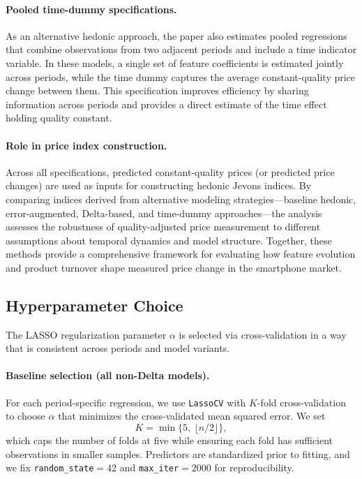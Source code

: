 \documentclass[12pt]{article}
\begin{document}
\paragraph{Pooled time-dummy specifications.}
As an alternative hedonic approach, the paper also estimates pooled regressions that combine observations from two adjacent periods and include a time indicator variable. In these models, a single set of feature coefficients is estimated jointly across periods, while the time dummy captures the average constant-quality price change between them. This specification improves efficiency by sharing information across periods and provides a direct estimate of the time effect holding quality constant.

\paragraph{Role in price index construction.}
Across all specifications, predicted constant-quality prices (or predicted price changes) are used as inputs for constructing hedonic Jevons indices. By comparing indices derived from alternative modeling strategies—baseline hedonic, error-augmented, Delta-based, and time-dummy approaches—the analysis assesses the robustness of quality-adjusted price measurement to different assumptions about temporal dynamics and model structure. Together, these methods provide a comprehensive framework for evaluating how feature evolution and product turnover shape measured price change in the smartphone market.



\subsection{Hyperparameter Choice}

The LASSO regularization parameter $\alpha$ is selected via cross-validation in a way that is consistent across periods and model variants.

\paragraph{Baseline selection (all non-Delta models).}
For each period-specific regression, we use \texttt{LassoCV} with $K$-fold cross-validation to choose $\alpha$ that minimizes the cross-validated mean squared error. We set
\[
K=\min\{5,\ \lfloor n/2\rfloor\},
\]
which caps the number of folds at five while ensuring each fold has sufficient observations in smaller samples. Predictors are standardized prior to fitting, and we fix \texttt{random\_state}$=42$ and \texttt{max\_iter}$=2000$ for reproducibility.
\end{document}

